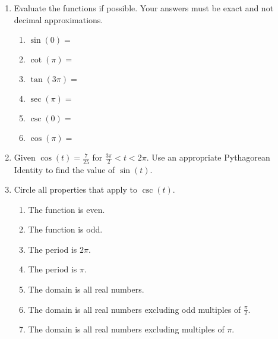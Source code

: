 



\begin{enumerate}
\item  Evaluate the functions if possible.  Your answers must be exact and not decimal approximations.

\begin{enumerate}

\item $\sin(0)=$\vfill
\item $\cot(\pi)=$\vfill
\item $\tan(3\pi)=$\vfill
\item $\sec(\pi)=$\vfill
\item $\csc(0)=$\vfill
\item $\cos(\pi)=$\vfill
\end{enumerate}




\newpage


\item  Given $ \displaystyle \cos(t)=\frac{7}{25}$ for $\displaystyle \frac{3\pi}{2}<t<2\pi$.  Use an appropriate Pythagorean Identity to find the value of $\sin(t)$.\vfill

\item  Circle all properties that apply to $\csc(t)$.
\begin{enumerate}
\item The function is even.
\item The function is odd.
\item The period is $2\pi$.
\item The period is $\pi$.
\item The domain is all real numbers.
\item The domain is all real numbers excluding odd multiples of $\frac{\pi}{2}$.
\item The domain is all real numbers excluding multiples of $\pi$.
\end{enumerate}



\end{enumerate}



